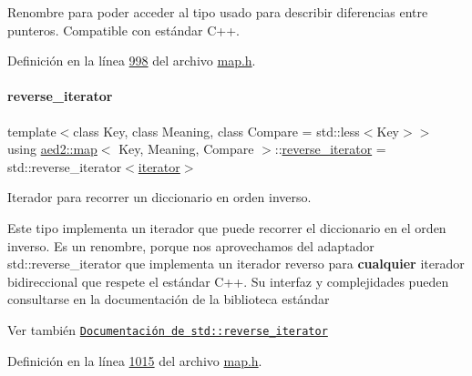 Renombre para poder acceder al tipo usado para describir diferencias entre punteros. Compatible con estándar C++. 



Definición en la línea \hyperlink{map_8h_source_l00998}{998} del archivo \hyperlink{map_8h_source}{map.\+h}.

\mbox{\label{classaed2_1_1map_a8e6a592062260177fd73b2f9897b1dd5_a8e6a592062260177fd73b2f9897b1dd5}} 
\paragraph{\texorpdfstring{reverse\+\_\+iterator}{reverse\_iterator}}
{\footnotesize\ttfamily template$<$class Key, class Meaning, class Compare = std\+::less$<$\+Key$>$$>$ \\
using \hyperlink{classaed2_1_1map}{aed2\+::map}$<$ Key, Meaning, Compare $>$\+::\hyperlink{classaed2_1_1map_a8e6a592062260177fd73b2f9897b1dd5_a8e6a592062260177fd73b2f9897b1dd5}{reverse\+\_\+iterator} =  std\+::reverse\+\_\+iterator$<$\hyperlink{classaed2_1_1map_1_1iterator}{iterator}$>$}



Iterador para recorrer un diccionario en orden inverso. 

Este tipo implementa un iterador que puede recorrer el diccionario en el orden inverso. Es un renombre, porque nos aprovechamos del adaptador {\ttfamily std\+::reverse\+\_\+iterator} que implementa un iterador reverso para {\bfseries cualquier} iterador bidireccional que respete el estándar C++. Su interfaz y complejidades pueden consultarse en la documentación de la biblioteca estándar

\begin{DoxySeeAlso}{Ver también}
\href{http://en.cppreference.com/w/cpp/iterator/reverse_iterator}{\tt Documentación de {\ttfamily std\+::reverse\+\_\+iterator}} 
\end{DoxySeeAlso}


Definición en la línea \hyperlink{map_8h_source_l01015}{1015} del archivo \hyperlink{map_8h_source}{map.\+h}.

\mbox{\label{classaed2_1_1map_aed66a216549d13078a3ea6978ea0b768_aed66a216549d13078a3ea6978ea0b768}} 

